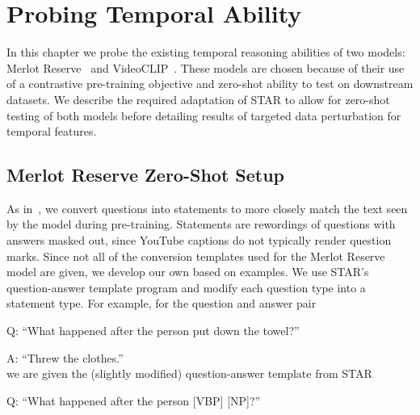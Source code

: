 
\chapter{Probing Temporal Ability}
\label{chap:probe}


In this chapter we probe the existing temporal reasoning abilities of two
models: Merlot Reserve~\citep{zellers2022mreserve} and
VideoCLIP~\citep{xu2021videoclip}.  These models are chosen because of their
use of a contrastive pre-training objective and zero-shot ability to test on
downstream datasets. We describe the required adaptation of STAR to allow for
zero-shot testing of both models before detailing results of targeted data
perturbation for temporal features.

\section{Merlot Reserve Zero-Shot Setup}
\label{sec:mres_zs}

As in~\citet{zellers2022mreserve}, we convert questions into statements to more
closely match the text seen by the model during pre-training. Statements are
rewordings of questions with answers masked out, since YouTube captions do not 
typically render question marks. Since not all of the conversion templates used
for the Merlot Reserve model are given, we develop our own based on examples. 
We use STAR's question-answer template program and modify each question type
into a statement type. For example, for the question and answer pair

Q: ``What happened after the person put down the towel?''

A: ``Threw the clothes.''\\
we are given the (slightly modified) question-answer template from STAR

Q: ``What happened after the person [VBP] [NP]?'' 

